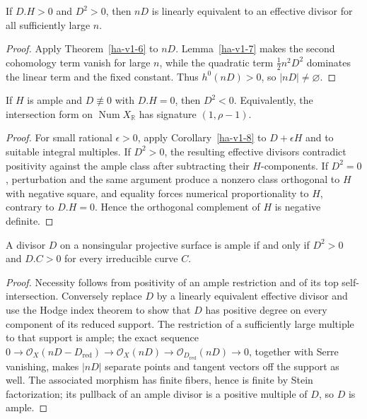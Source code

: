 \begin{corollary}
\label{ha-v1-8}
If \(D.H>0\) and \(D^2>0\), then \(nD\) is linearly equivalent to an effective
divisor for all sufficiently large \(n\).
\end{corollary}
\begin{proof}
Apply Theorem~\ref{ha-v1-6} to \(nD\).  Lemma~\ref{ha-v1-7} makes the second
cohomology term vanish for large \(n\), while the quadratic term
\(\frac12n^2D^2\) dominates the linear term and the fixed constant.  Thus
\(h^0(nD)>0\), so \(|nD|\ne\varnothing\).
\end{proof}

\begin{theorem}
\label{ha-v1-9}
If \(H\) is ample and \(D\not\equiv0\) with \(D.H=0\), then \(D^2<0\).
Equivalently, the intersection form on \(\operatorname{Num}X_\mathbb R\) has
signature \((1,\rho-1)\).
\end{theorem}
\begin{proof}
For small rational \(\epsilon>0\), apply Corollary~\ref{ha-v1-8} to
\(D+\epsilon H\) and to suitable integral multiples.  If \(D^2>0\), the
resulting effective divisors contradict positivity against the ample class
after subtracting their \(H\)-components.  If \(D^2=0\), perturbation and the
same argument produce a nonzero class orthogonal to \(H\) with negative square,
and equality forces numerical proportionality to \(H\), contrary to
\(D.H=0\).  Hence the orthogonal complement of \(H\) is negative definite.
\end{proof}

\begin{theorem}
\label{ha-v1-10}
A divisor \(D\) on a nonsingular projective surface is ample if and only if
\(D^2>0\) and \(D.C>0\) for every irreducible curve \(C\).

\end{theorem}
\begin{proof}
Necessity follows from positivity of an ample restriction and of its top
self-intersection.  Conversely replace \(D\) by a linearly equivalent effective
divisor and use the Hodge index theorem to show that \(D\) has positive degree
on every component of its reduced support.  The restriction of a sufficiently
large multiple to that support is ample; the exact sequence
\(0\to\mathcal O_X(nD-D_{\mathrm{red}})\to\mathcal O_X(nD)\to
\mathcal O_{D_{\mathrm{red}}}(nD)\to0\), together with Serre vanishing, makes
\(|nD|\) separate points and tangent vectors off the support as well.  The
associated morphism has finite fibers, hence is finite by Stein factorization;
its pullback of an ample divisor is a positive multiple of \(D\), so \(D\) is
ample.
\end{proof}

